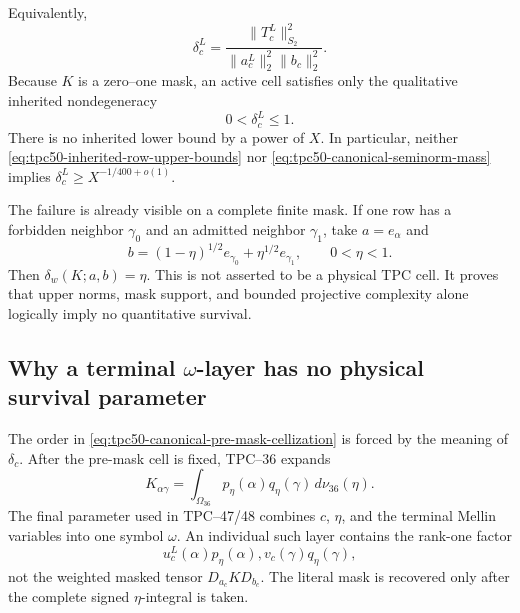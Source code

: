 Equivalently,
\begin{equation}
 \delta_c^L
 =\frac{\|T_c^L\|_{S_2}^2}
 {\|a_c^L\|_2^2\|b_c\|_2^2}.
 \label{eq:tpc50-cell-survival-Frobenius}
\end{equation}
Because \(K\) is a zero--one mask, an active cell satisfies only the
qualitative inherited nondegeneracy
\begin{equation}
 0<\delta_c^L\le1.
 \label{eq:tpc50-qualitative-cell-nondegeneracy}
\end{equation}
There is no inherited lower bound by a power of \(X\).  In particular,
neither \eqref{eq:tpc50-inherited-row-upper-bounds} nor
\eqref{eq:tpc50-canonical-seminorm-mass} implies
\(\delta_c^L\ge X^{-1/400+o(1)}\).

The failure is already visible on a complete finite mask.  If one row
has a forbidden neighbor \(\gamma_0\) and an admitted neighbor
\(\gamma_1\), take \(a=e_\alpha\) and
\begin{equation}
 b=(1-\eta)^{1/2}e_{\gamma_0}
   +\eta^{1/2}e_{\gamma_1},
 \qquad 0<\eta<1.
 \label{eq:tpc50-concentrated-weight-model}
\end{equation}
Then \(\delta_w(K;a,b)=\eta\).  This is not asserted to be a physical
TPC cell.  It proves that upper norms, mask support, and bounded
projective complexity alone logically imply no quantitative survival.

\subsection{Why a terminal \texorpdfstring{\(\omega\)}{omega}-layer has no physical
survival parameter}

The order in \eqref{eq:tpc50-canonical-pre-mask-cellization} is forced
by the meaning of \(\delta_c\).  After the pre-mask cell is fixed,
TPC--36 expands
\begin{equation}
 K_{\alpha\gamma}
 =\int_{\Omega_{36}}p_\eta(\alpha)q_\eta(\gamma)
 \,d\nu_{36}(\eta).
 \label{eq:tpc50-specified-mask-representation}
\end{equation}
The final parameter used in TPC--47/48 combines \(c\), \(\eta\), and
the terminal Mellin variables into one symbol \(\omega\).  An
individual such layer contains the rank-one factor
\begin{equation}
 u_c^L(\alpha)p_\eta(\alpha),
 v_c(\gamma)q_\eta(\gamma),
 \label{eq:tpc50-terminal-rank-one-layer}
\end{equation}
not the weighted masked tensor \(D_{a_c}KD_{b_c}\).  The literal mask is
recovered only after the complete signed \(\eta\)-integral is taken.

